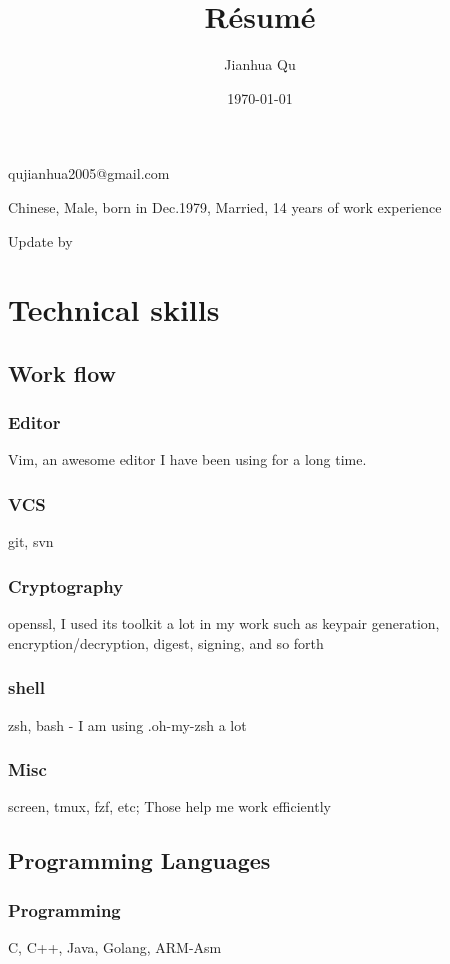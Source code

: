 \documentclass{article}
\makeatletter
\renewcommand{\maketitle}{
\begin{center}

{\huge\bfseries\theauthor}

\vspace{.25em}
qujianhua2005@gmail.com


\vspace{.25em}
Chinese, Male, born in Dec.1979, Married, 14 years of work experience

\vspace{.25em}
Update by \thedate

\end{center}
}
\makeatother
\begin{document}
\title {R\'esum\'e}
\author {Jianhua Qu}
\date{\today}

\maketitle

\section{Technical skills}

\subsection{Work flow}
\subsubsection{Editor}
Vim, an awesome editor I have been using for a long time.

\subsubsection{VCS}
git, svn

\subsubsection{Cryptography}
openssl, I used its toolkit a lot in my work such as keypair generation,
        encryption/decryption, digest, signing, and so forth

\subsubsection{shell}
zsh, bash - I am using .oh-my-zsh a lot

\subsubsection{Misc}
screen, tmux, fzf, etc;
Those help me work efficiently

\subsection{Programming Languages}

\subsubsection{Programming}
C, C++, Java, Golang, ARM-Asm
\end{document}
